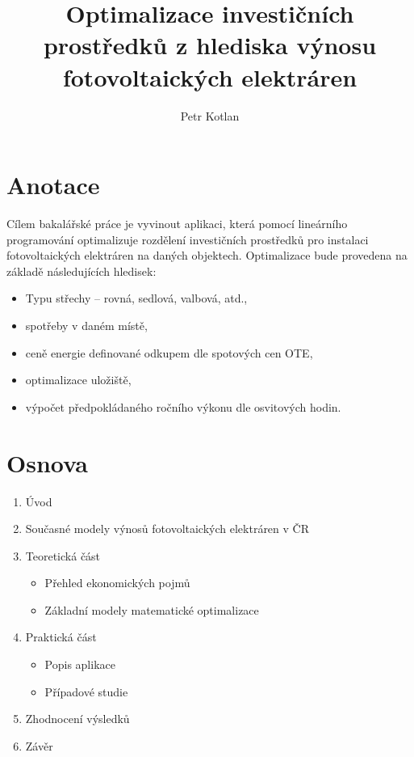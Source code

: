 \documentclass[12pt, aspectratio=169]{beamer} %
\title[Optimalizace FVE]{Optimalizace investičních prostředků z hlediska výnosu fotovoltaických elektráren}
\author[Kotlan]{Petr Kotlan}
\institute[Přf UJEP]{Přírodovědecká fakulta\\ Univerzita J. E. Purkyně}
\date{}
\begin{document}
\begin{frame}[plain]

    \maketitle
    
\end{frame}

\section{Anotace}

\begin{frame}{\insertsection}
Cílem bakalářské práce je vyvinout aplikaci, která pomocí lineárního programování
optimalizuje rozdělení investičních prostředků pro instalaci fotovoltaických elektráren na daných objektech.
Optimalizace bude provedena na základě následujících hledisek:
\begin{itemize}

    \item Typu střechy – rovná, sedlová, valbová, atd.,
    \item spotřeby v daném místě,
    \item ceně energie definované odkupem dle spotových cen OTE,
    \item optimalizace uložiště,
    \item výpočet předpokládaného ročního výkonu dle osvitových hodin.

\end{itemize}
\end{frame}

\section{Osnova}

\begin{frame}{\insertsection}
    \begin{enumerate}
        \item Úvod
        \item Současné modely výnosů fotovoltaických elektráren v ČR
        \item Teoretická část
        \begin{itemize}
            \item Přehled ekonomických pojmů
            \item Základní modely matematické optimalizace
        \end{itemize}
        \item Praktická část
        \begin{itemize}
            \item Popis aplikace
            \item Případové studie
        \end{itemize}
        \item Zhodnocení výsledků
        \item Závěr
        
    \end{enumerate}
\end{frame}
\end{document}

